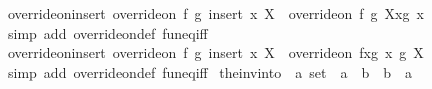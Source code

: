 \begin{isabellebody}
\endisatagproof
{\isafoldproof}%
%
\isadelimproof
\isanewline
%
\endisadelimproof
\isanewline
{}\isamarkupfalse%
\ override{\isacharunderscore}{\kern0pt}on{\isacharunderscore}{\kern0pt}insert{\isacharcolon}{\kern0pt}\ {\isachardoublequoteopen}override{\isacharunderscore}{\kern0pt}on\ f\ g\ {\isacharparenleft}{\kern0pt}insert\ x\ X{\isacharparenright}{\kern0pt}\ {\isacharequal}{\kern0pt}\ {\isacharparenleft}{\kern0pt}override{\isacharunderscore}{\kern0pt}on\ f\ g\ X{\isacharparenright}{\kern0pt}{\isacharparenleft}{\kern0pt}x{\isacharcolon}{\kern0pt}{\isacharequal}{\kern0pt}g\ x{\isacharparenright}{\kern0pt}{\isachardoublequoteclose}\isanewline
%
\isadelimproof
\ \ %
\endisadelimproof
%
\isatagproof
{}\isamarkupfalse%
\ {\isacharparenleft}{\kern0pt}simp\ add{\isacharcolon}{\kern0pt}\ override{\isacharunderscore}{\kern0pt}on{\isacharunderscore}{\kern0pt}def\ fun{\isacharunderscore}{\kern0pt}eq{\isacharunderscore}{\kern0pt}iff{\isacharparenright}{\kern0pt}%
\endisatagproof
{\isafoldproof}%
%
\isadelimproof
\isanewline
%
\endisadelimproof
\isanewline
{}\isamarkupfalse%
\ override{\isacharunderscore}{\kern0pt}on{\isacharunderscore}{\kern0pt}insert{\isacharprime}{\kern0pt}{\isacharcolon}{\kern0pt}\ {\isachardoublequoteopen}override{\isacharunderscore}{\kern0pt}on\ f\ g\ {\isacharparenleft}{\kern0pt}insert\ x\ X{\isacharparenright}{\kern0pt}\ {\isacharequal}{\kern0pt}\ {\isacharparenleft}{\kern0pt}override{\isacharunderscore}{\kern0pt}on\ {\isacharparenleft}{\kern0pt}f{\isacharparenleft}{\kern0pt}x{\isacharcolon}{\kern0pt}{\isacharequal}{\kern0pt}g\ x{\isacharparenright}{\kern0pt}{\isacharparenright}{\kern0pt}\ g\ X{\isacharparenright}{\kern0pt}{\isachardoublequoteclose}\isanewline
%
\isadelimproof
\ \ %
\endisadelimproof
%
\isatagproof
{}\isamarkupfalse%
\ {\isacharparenleft}{\kern0pt}simp\ add{\isacharcolon}{\kern0pt}\ override{\isacharunderscore}{\kern0pt}on{\isacharunderscore}{\kern0pt}def\ fun{\isacharunderscore}{\kern0pt}eq{\isacharunderscore}{\kern0pt}iff{\isacharparenright}{\kern0pt}%
\endisatagproof
{\isafoldproof}%
%
\isadelimproof
%
\endisadelimproof
%
\isadelimdocument
%
\endisadelimdocument
%
\isatagdocument
%
\isamarkuptrue%
%
\endisatagdocument
{\isafolddocument}%
%
\isadelimdocument
%
\endisadelimdocument
{}\isamarkupfalse%
\ the{\isacharunderscore}{\kern0pt}inv{\isacharunderscore}{\kern0pt}into\ {\isacharcolon}{\kern0pt}{\isacharcolon}{\kern0pt}\ {\isachardoublequoteopen}{\isacharprime}{\kern0pt}a\ set\ {\isasymRightarrow}\ {\isacharparenleft}{\kern0pt}{\isacharprime}{\kern0pt}a\ {\isasymRightarrow}\ {\isacharprime}{\kern0pt}b{\isacharparenright}{\kern0pt}\ {\isasymRightarrow}\ {\isacharparenleft}{\kern0pt}{\isacharprime}{\kern0pt}b\ {\isasymRightarrow}\ {\isacharprime}{\kern0pt}a{\isacharparenright}{\kern0pt}{\isachardoublequoteclose}\isanewline

\end{isabellebody}
